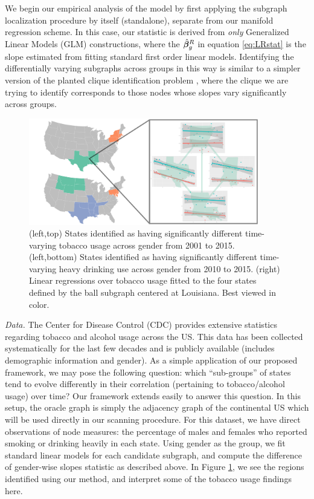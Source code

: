 We begin our empirical analysis of the model by first applying the subgraph localization procedure by itself (standalone), separate from our manifold regression scheme. In this case, our statistic is derived from {\em only} Generalized Linear Models (GLM) constructions, where the $\hat{\bm{\beta}}_g^R$ in equation \eqref{eq:LRstat} is the slope estimated from fitting standard first order linear models. Identifying the differentially varying subgraphs across groups in this way is similar to a simpler version of the planted clique identification problem \citep{arora2009computational}, where the clique we are trying to identify corresponds to those nodes whose slopes vary significantly across groups.
\begin{figure}
	\begin{center}
		\includegraphics[trim={0cm 0cm 0cm 0cm}, clip, width=0.9\textwidth]{3_covtraj/figs/tobacco_zoom.pdf}
	\end{center}
	\caption[Tobacco use relationships via covariance trajectory analysis]{(left,top) States identified as having significantly different time-varying tobacco usage across gender from 2001 to 2015. (left,bottom) States identified as having significantly different time-varying heavy drinking use across gender from 2010 to 2015. (right) Linear regressions over tobacco usage fitted to the four states defined by the ball subgraph centered at Louisiana. Best viewed in color.}
	\label{fig:tobalc}
\end{figure}

{\em Data.} The Center for Disease Control (CDC) provides extensive statistics regarding tobacco and alcohol usage across the US. This data has been collected systematically for the last few decades and is publicly available (includes demographic information and gender). As a simple application of our 
proposed framework, 
we may pose the following question: which ``sub-groups'' of states tend to evolve differently in their correlation (pertaining to tobacco/alcohol usage) over time? 
Our framework extends easily to answer this question. In this setup, the oracle graph is simply the adjacency graph of the continental
US which will be used directly in our scanning procedure.
For this dataset, we have direct observations of node measures: the percentage of males and females who 
reported smoking or drinking heavily in each state. Using 
gender as the group, 
we fit standard linear models for each candidate subgraph, and compute the difference of gender-wise 
slopes statistic as described above. 
In Figure \ref{fig:tobalc}, we see the regions identified using our method, and interpret some of the tobacco usage findings here.

